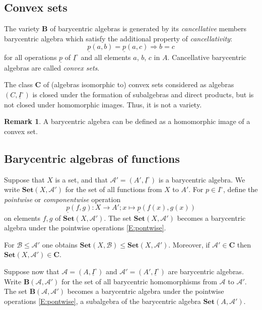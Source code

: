 \documentclass[12pt]{amsart}
\theoremstyle{plain}
\theoremstyle{definition}
\newtheorem{remark}[theorem]{Remark}
\numberwithin{equation}{section}
\begin{document}
\subsection{Convex sets}
The variety $\mathbf{B}$ of barycentric algebras is generated by its \emph{cancellative} members  barycentric algebra which satisfy the additional property of \emph{cancellativity}:
$$
\underline{p}(a,b)=\underline{p}(a,c) \mathrel{\Rightarrow} b=c
$$
for all operations $\underline{p}$ of $\underline{I}^{\circ}$ and all elements $a$, $b$, $c$ in $A$. Cancellative barycentric algebras are called \emph{convex sets}. 



The class $\mathbf{C}$ of (algebras isomorphic to) convex sets considered as algebras $(C,\underline{I}^{\circ})$ is closed under the formation of subalgebras and direct products, but is not closed under homomorphic images. Thus, it is not a variety.

\begin{remark}\label{D:BarycAlg}
A barycentric algebra can be defined as a homomorphic image of a convex set.
\end{remark}


\subsection{Barycentric algebras of functions}

Suppose that $X$ is a set, and that $\mathcal{A}'=(A',\underline{I}^{\circ})$ is a barycentric algebra.
We write $\mathbf{Set}(X,\mathcal{A}')$ for the set of all functions from $X$ to $A'$.
For $p\in I^\circ$, define the \emph{pointwise} or \emph{componentwise} operation
\begin{equation}\label{E:pontwise}
\underline p(f,g)\colon X\to A';x\mapsto \underline p(f(x),g(x))
\end{equation}
on elements $f,g$ of $\mathbf{Set}(X,\mathcal{A}')$.
The set $\mathbf{Set}(X,\mathcal{A}')$ becomes a barycentric algebra under the pointwise operations \eqref{E:pontwise}. 

For $\mathcal{B}\leq\mathcal{A}'$ one obtains $\mathbf{Set}(X,\mathcal{B})\leq\mathbf{Set}(X,\mathcal{A}')$. Moreover, if $\mathcal{A}'\in\mathbf{C}$ then $\mathbf{Set}(X,\mathcal{A}')\in\mathbf{C}$.

Suppose now that $\mathcal{A}=(A,\underline{I}^{\circ})$ and $\mathcal{A}'=(A',\underline{I}^{\circ})$ are barycentric algebras. Write $\mathbf B(\mathcal{A},\mathcal{A}')$ for the set of all barycentric homomorphisms from $\mathcal{A}$ to $\mathcal{A}'$. The set $\mathbf B(\mathcal{A},\mathcal{A}')$ becomes a barycentric algebra under the pointwise operations \eqref{E:pontwise}, a subalgebra of the barycentric algebra $\mathbf{Set}(A,\mathcal{A}')$.
\end{document}
